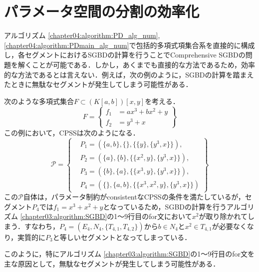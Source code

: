 \section{パラメータ空間の分割の効率化}
アルゴリズム \ref{chapter04:algorithm:PD_alg_num}, \ref{chapter04:algorithm:PDmain_alg_num}で包括的多項式項集合系を直接的に構成し，各セグメントにおけるSGBDの計算を行うことでComprehensive SGBDの問題を解くことが可能である．しかし，あくまでも直接的な方法であるため，効率的な方法であるとは言えない．例えば，次の例のように，SGBDの計算を踏まえたときに無駄なセグメントが発生してしまう可能性がある．
\begin{example}
	次のような多項式集合$F \subset (K[a, b])[x, y]$を考える．
	\begin{equation*}
		F = \left\{
			\begin{aligned}
				f_1 &= ax^3 + bx^2 + y \\
				f_2 &= y^3 + x
			\end{aligned}
		\right\}
	\end{equation*}
	この例において，CPSSは次のようになる．
	\begin{equation*}
		\mathcal{P} = 
		\left\{
			\begin{aligned}
				&P_1 = \left( \{a, b\}, \{\}, \{ \{y\}, \{y^3, x\} \} \right), \\
				&P_2 = \left( \{a\}, \{b\}, \{ \{x^2, y\}, \{y^3, x\} \} \right), \\
				&P_3 = \left( \{b\}, \{a\}, \{ \{x^3, y\}, \{y^3, x\} \} \right), \\
				&P_4 = \left( \{\}, \{a, b\}, \{ \{x^3, x^2, y\}, \{y^3, x\} \} \right)
			\end{aligned}
		\right\}
	\end{equation*}
	この$\mathcal{P}$自体は，パラメータ制約がconsistentなCPSSの条件を満たしているが，セグメント$P_4$では$f_1 = x^3 + x^2 + y$となっているため，SGBDの計算を行うアルゴリズム \ref{chapter03:algorithm:SGBD}の1〜9行目のfor文において$x^2$が取り除かれてしまう．すなわち，$P_4=(E_4, N_4, \{T_{4, 1}, T_{4, 2}\})$から$b \in N_4$と$x^2 \in T_{4, 1}$が必要なくなり，実質的に$P_3$と等しいセグメントとなってしまっている．
\end{example}
このように，特にアルゴリズム \ref{chapter03:algorithm:SGBD}の1〜9行目のfor文を主な原因として，無駄なセグメントが発生してしまう可能性がある．


